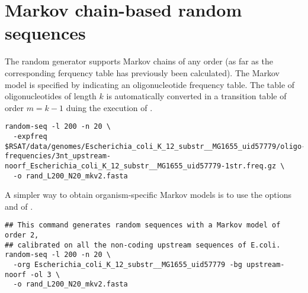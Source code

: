 \section{Markov chain-based random sequences}

The random generator  supports Markov chains of
any order (as far as the corresponding ferquency table has previously
been calculated). The Markov model is specified by indicating an
oligonucleotide frequency table. The table of oligonucleotides of
length $k$ is automatically converted in a transition table of order
$m=k-1$ duing the execution of . 


\begin{small}
\begin{verbatim}
random-seq -l 200 -n 20 \
  -expfreq $RSAT/data/genomes/Escherichia_coli_K_12_substr__MG1655_uid57779/oligo-frequencies/3nt_upstream-noorf_Escherichia_coli_K_12_substr__MG1655_uid57779-1str.freq.gz \
  -o rand_L200_N20_mkv2.fasta 
\end{verbatim}
\end{small}

A simpler way to obtain organism-specific Markov models is to use the
options  and  of . 

\begin{small}
\begin{verbatim}
## This command generates random sequences with a Markov model of order 2,
## calibrated on all the non-coding upstream sequences of E.coli.
random-seq -l 200 -n 20 \
  -org Escherichia_coli_K_12_substr__MG1655_uid57779 -bg upstream-noorf -ol 3 \
  -o rand_L200_N20_mkv2.fasta 
\end{verbatim}
\end{small}



